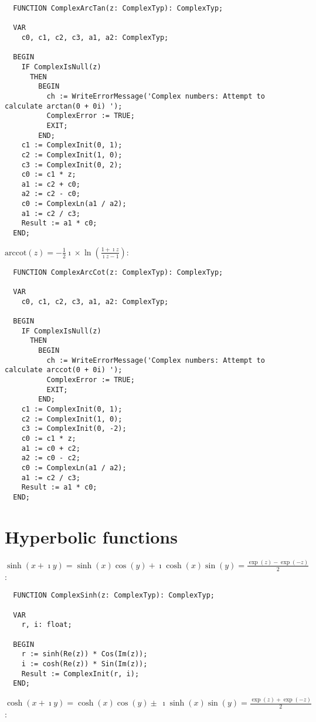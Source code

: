 \begin{refsection}
\begin{lstlisting}
  FUNCTION ComplexArcTan(z: ComplexTyp): ComplexTyp;

  VAR
    c0, c1, c2, c3, a1, a2: ComplexTyp;

  BEGIN
    IF ComplexIsNull(z)
      THEN
        BEGIN
          ch := WriteErrorMessage('Complex numbers: Attempt to calculate arctan(0 + 0i) ');
          ComplexError := TRUE;
          EXIT;
        END;
    c1 := ComplexInit(0, 1);
    c2 := ComplexInit(1, 0);
    c3 := ComplexInit(0, 2);
    c0 := c1 * z;
    a1 := c2 + c0;
    a2 := c2 - c0;
    c0 := ComplexLn(a1 / a2);
    a1 := c2 / c3;
    Result := a1 * c0;
  END;
\end{lstlisting}

\( \mathrm{arccot}(z) = -\frac{1}{2} \imath \times \ln(\frac{1 + \imath z}{\imath z - 1}) \):

\begin{lstlisting}
  FUNCTION ComplexArcCot(z: ComplexTyp): ComplexTyp;

  VAR
    c0, c1, c2, c3, a1, a2: ComplexTyp;

  BEGIN
    IF ComplexIsNull(z)
      THEN
        BEGIN
          ch := WriteErrorMessage('Complex numbers: Attempt to calculate arccot(0 + 0i) ');
          ComplexError := TRUE;
          EXIT;
        END;
    c1 := ComplexInit(0, 1);
    c2 := ComplexInit(1, 0);
    c3 := ComplexInit(0, -2);
    c0 := c1 * z;
    a1 := c0 + c2;
    a2 := c0 - c2;
    c0 := ComplexLn(a1 / a2);
    a1 := c2 / c3;
    Result := a1 * c0;
  END;
\end{lstlisting}


\section{Hyperbolic functions}

\( \sinh(x + \imath y) = \sinh(x) \cos(y) + \imath \cosh(x) \sin(y) = \frac{\exp(z) - \exp(-z)}{2} \):

\begin{lstlisting}
  FUNCTION ComplexSinh(z: ComplexTyp): ComplexTyp;

  VAR
    r, i: float;

  BEGIN
    r := sinh(Re(z)) * Cos(Im(z));
    i := cosh(Re(z)) * Sin(Im(z));
    Result := ComplexInit(r, i);
  END;
\end{lstlisting}

\( \cosh(x + \imath y) = \cosh(x) \cos(y) \pm\ \imath \sinh(x) \sin(y)  = \frac{\exp(z) + \exp(-z)}{2} \):


\end{refsection}
